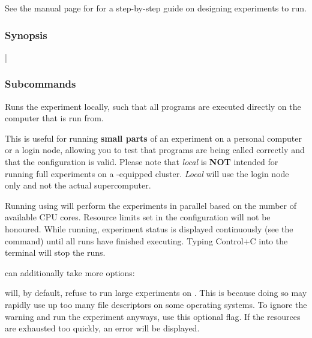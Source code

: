 \documentclass[a4paper,english]{article}
\begin{document}
\begin{adjustwidth}{18pt}{0pt}
                See the manual page for  for a step-by-step guide on
                designing experiments to run.


            \subsubsection{Synopsis}
                |

            \subsubsection{Subcommands}
                \begin{Description}[Subcommands]
                    \item[\Arg{local}]
                        Runs the experiment locally, such that all programs are executed directly on the computer
                        that  is run from.

                        This is useful for running \textbf{small parts} of an experiment on
                        a personal computer or a login node, allowing you to test that programs
                        are being called correctly and that the configuration is valid.
                        Please note that \emph{local} is \textbf{NOT} intended for running full
                        experiments on a -equipped cluster.
                        \emph{Local} will use the login node only and not the actual
                        supercomputer.

                        Running using   will perform the experiments in
                        parallel based on the number of available CPU cores.
                        Resource limits set in the configuration will not be honoured.
                        While running, experiment status is displayed continuously (see the
                          command) until all runs have finished executing.
                        Typing Control+C into the terminal will stop the runs.

                         can additionally take more options:
                            \begin{Description}[Options]
                                \item[\Opt{\ddash force}]
                                   will, by default, refuse to run large experiments on . This is
                                  because doing so may rapidly use up too many file descriptors on some operating systems.
                                  To ignore the warning and run the experiment anyways, use this optional flag.
                                  If the resources are exhausted too quickly, an error will be displayed.


\end{Description}
\end{Description}
\end{adjustwidth}
\end{document}
